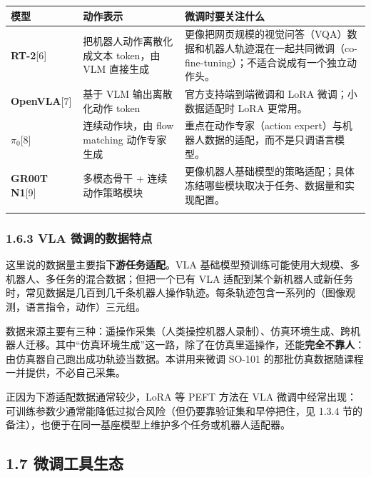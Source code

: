 \documentclass[
  chinese,
]{ctexart}
\begin{document}
\begin{center}
\begin{tabular}{@{}>{\raggedright\arraybackslash}p{} >{\raggedright\arraybackslash}p{} >{\raggedright\arraybackslash}p{}@{}}
\toprule\noalign{}
模型 & 动作表示 & 微调时要关注什么 \\
\midrule\noalign{}
\textbf{RT-2}{[}6{]} & 把机器人动作离散化成文本 token，由 VLM 直接生成 & 更像把网页规模的视觉问答（VQA）数据和机器人轨迹混在一起共同微调（co-fine-tuning）；不适合说成有一个独立动作头。 \\
\textbf{OpenVLA}{[}7{]} & 基于 VLM 输出离散化动作 token & 官方支持端到端微调和 LoRA 微调；小数据适配时 LoRA 更常用。 \\
\textbf{\(\pi_0\)}{[}8{]} & 连续动作块，由 flow matching 动作专家生成 & 重点在动作专家（action expert）与机器人数据的适配，而不是只调语言模型。 \\
\textbf{GR00T N1}{[}9{]} & 多模态骨干 + 连续动作策略模块 & 更像机器人基础模型的策略适配；具体冻结哪些模块取决于任务、数据量和实现配置。 \\
\bottomrule\noalign{}
\end{tabular}
\end{center}

\subsubsection{1.6.3 VLA
微调的数据特点}\label{vla-ux5faeux8c03ux7684ux6570ux636eux7279ux70b9}

这里说的数据量主要指\textbf{下游任务适配}。VLA
基础模型预训练可能使用大规模、多机器人、多任务的混合数据；但把一个已有
VLA
适配到某个新机器人或新任务时，常见数据是几百到几千条机器人操作轨迹。每条轨迹包含一系列的（图像观测，语言指令，动作）三元组。

数据来源主要有三种：遥操作采集（人类操控机器人录制）、仿真环境生成、跨机器人迁移。其中``仿真环境生成''这一路，除了在仿真里遥操作，还能\textbf{完全不靠人}：由仿真器自己跑出成功轨迹当数据。本讲用来微调
SO-101 的那批仿真数据随课程一并提供，不必自己采集。

正因为下游适配数据通常较少，LoRA 等 PEFT 方法在 VLA
微调中经常出现：可训练参数少通常能降低过拟合风险（但仍要靠验证集和早停把住，见
1.3.4 节的备注），也便于在同一基座模型上维护多个任务或机器人适配器。

\subsection{1.7
微调工具生态}\label{ux5faeux8c03ux5de5ux5177ux751fux6001}
\end{document}
